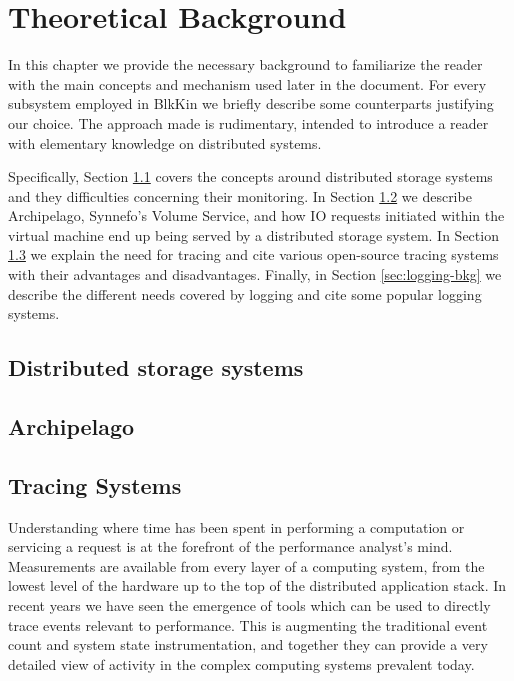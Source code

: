 \chapter{Theoretical Background}\label{ch:bkg}

In this chapter we provide the necessary background to familiarize the reader
with the main concepts and mechanism used later in the document. For every
subsystem employed in BlkKin we briefly describe some counterparts justifying
our choice. The approach made is rudimentary, intended to introduce a reader
with elementary knowledge on distributed systems.

Specifically, Section \ref{sec:storage} covers the concepts around distributed
storage systems and they difficulties concerning their monitoring.  In Section
\ref{sec:archip-bkg} we describe Archipelago, Synnefo's Volume Service, and how
IO requests initiated within the virtual machine end up being served by a
distributed storage system. In Section \ref{sec:tracing-bkg} we explain the need
for tracing and cite various open-source tracing systems  with their advantages
and disadvantages. Finally, in Section \ref{sec:logging-bkg} we describe the
different needs covered by logging and cite some popular logging systems.


\section{Distributed storage systems}\label{sec:storage}

\section{Archipelago}\label{sec:archip-bkg}

\section{Tracing Systems}\label{sec:tracing-bkg}
Understanding where time has been spent in performing a computation or servicing
a request is at the forefront of the performance analyst’s mind. Measurements
are available from every layer of a computing system, from the lowest level of
the hardware up to the top of the distributed application stack. In recent years
we have seen the emergence of tools which can be used to directly trace events
relevant to performance. This is augmenting the traditional event count and
system state instrumentation, and together they can provide a very detailed view
of activity in the complex computing systems prevalent today.

